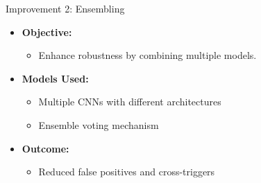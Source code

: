 \documentclass{beamer}
\begin{document}
\begin{frame}{Improvement 2: Ensembling}
  \begin{itemize}
    \item \textbf{Objective:}
        \begin{itemize}
        \item     Enhance robustness by combining multiple models.
      \end{itemize}

    \item \textbf{Models Used:}
      \begin{itemize}
        \item Multiple CNNs with different architectures
        \item Ensemble voting mechanism
      \end{itemize}
    \item \textbf{Outcome:}
      \begin{itemize}
        \item Reduced false positives and cross-triggers
      \end{itemize}
      \end{itemize}
\end{frame}
\end{document}
